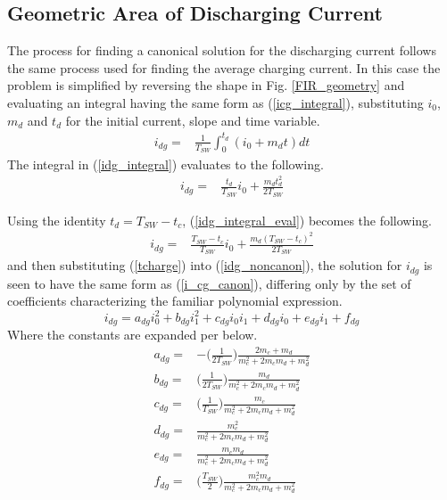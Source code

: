 \documentclass[conference]{IEEEtran}
\begin{document}
\subsection{Geometric Area of Discharging Current}
The process for finding a canonical solution for the discharging current follows the same process used for finding the average charging current. In this case the problem is simplified by reversing the shape in Fig. \ref{FIR_geometry} and evaluating an integral having the same form as (\ref{icg_integral}), substituting $i_0$, $m_d$ and $t_d$ for the initial current, slope and time variable.
\begin{align}
i_{dg} = & \frac{1}{T_{SW}}\int_0^{t_d}(i_0 + m_d t)dt \label{idg_integral}
\end{align}
The integral in (\ref{idg_integral}) evaluates to the following.
\begin{align}
i_{dg} = & \frac{t_d}{T_{SW}} i_0 + \frac{m_dt_d^2}{2T_{SW}}
\label{idg_integral_eval}
\end{align}

Using the identity $t_d = T_{SW} - t_c$, (\ref{idg_integral_eval}) becomes the following.
\begin{align}
i_{dg} = & \frac{ T_{SW} - t_c}{T_{SW}} i_0 + \frac{m_d( T_{SW} - t_c)^2}{2T_{SW}}
\label{idg_noncanon}
\end{align}
and then substituting (\ref{tcharge}) into (\ref{idg_noncanon}), the solution for \(i_{dg}\) is seen to have the same form as (\ref{i_cg_canon}), differing only by the set of coefficients characterizing the familiar polynomial expression.
\begin{equation}
i_{dg} = a_{dg}i_0^2+b_{dg}i_1^2+c_{dg}i_0i_1+d_{dg}i_0+e_{dg}i_1+f_{dg} \label{i_dg_canon}
\end{equation}
Where the constants are expanded per below.
\begin{align*}
a_{dg} = & - \bigg (\frac{1}{2T_{SW}} \bigg)  \frac{2m_c + m_d}{m_c^2+2m_cm_d+m_d^2}  \nonumber\\
b_{dg} = &  \bigg ( \frac{1}{2T_{SW}} \bigg ) \frac{m_d}{m_c^2+2m_cm_d+m_d^2}  \nonumber\\
c_{dg} = & \bigg ( \frac{1}{T_{SW}} \bigg ) \frac{m_c}{m_c^2+2m_cm_d+m_d^2} \nonumber\\
d_{dg} = & \frac{m_c^2}{m_c^2+2m_cm_d+m_d^2}\nonumber\\
e_{dg} = & \frac{m_c m_d}{m_c^2+2m_cm_d+m_d^2}\nonumber\\
f_{dg} = & \bigg ( \frac{T_{SW}}{2} \bigg ) \frac{m_c^2 m_d}{m_c^2+2m_cm_d+m_d^2}
\end{align*}
\end{document}
